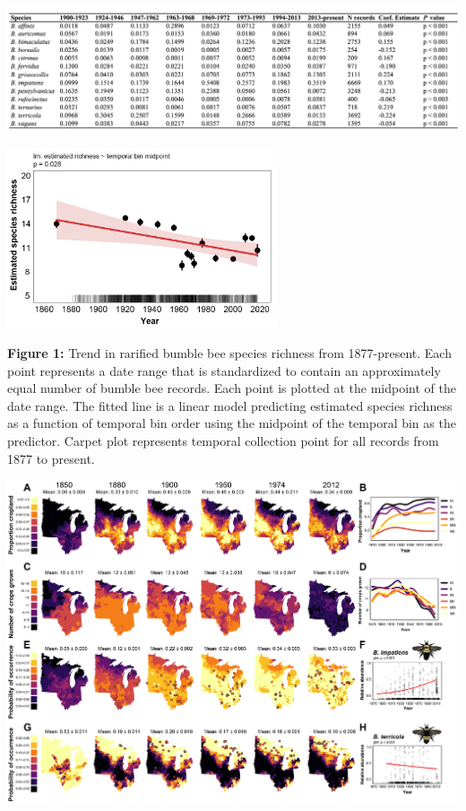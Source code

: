 \documentclass[11pt,]{article}
\begin{document}
\includegraphics[width=1\textwidth,height=\textheight]{../ms_figs/table1.png}

\clearpage

\newpage

\includegraphics[width=0.6\textwidth,height=\textheight]{../ms_figs/fig1.png}

\textbf{Figure 1:} Trend in rarified bumble bee species richness from
1877-present. Each point represents a date range that is standardized to
contain an approximately equal number of bumble bee records. Each point
is plotted at the midpoint of the date range. The fitted line is a
linear model predicting estimated species richness as a function of
temporal bin order using the midpoint of the temporal bin as the
predictor. Carpet plot represents temporal collection point for all
records from 1877 to present.

\clearpage

\newpage

\includegraphics[width=1\textwidth,height=\textheight]{../ms_figs/fig2.png}
\end{document}
